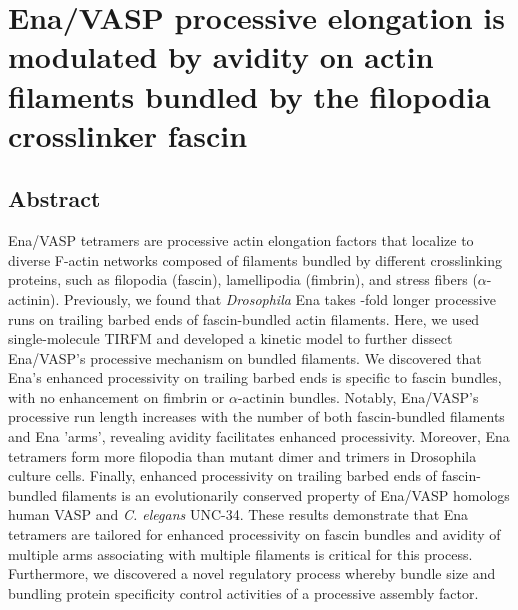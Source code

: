 \chapter{Ena/VASP processive elongation is modulated by avidity on actin filaments bundled by the filopodia crosslinker fascin}\label{ch:ena}

\section[Abstract]{Abstract\footnotemark}
Ena/VASP tetramers are processive actin elongation factors that localize to diverse F-actin networks composed of filaments bundled by different crosslinking proteins, such as filopodia (fascin), lamellipodia (fimbrin), and stress fibers ($\alpha$-actinin). Previously, we found that \textit{Drosophila} Ena takes -fold longer processive runs on trailing barbed ends of fascin-bundled actin filaments. Here, we used single-molecule TIRFM and developed a kinetic model to further dissect Ena/VASP's processive mechanism on bundled filaments. We discovered that Ena's enhanced processivity on trailing barbed ends is specific to fascin bundles, with no enhancement on fimbrin or $\alpha$-actinin bundles. Notably, Ena/VASP's processive run length increases with the number of both fascin-bundled filaments and Ena 'arms', revealing avidity facilitates enhanced processivity. Moreover, Ena tetramers form more filopodia than mutant dimer and trimers in Drosophila culture cells. Finally, enhanced processivity on trailing barbed ends of fascin-bundled filaments is an evolutionarily conserved property of Ena/VASP homologs human VASP and \textit{C. elegans} UNC-34. These results demonstrate that Ena tetramers are tailored for enhanced processivity on fascin bundles and avidity of multiple arms associating with multiple filaments is critical for this process. Furthermore, we discovered a novel regulatory process whereby bundle size and bundling protein specificity control activities of a processive assembly factor.


